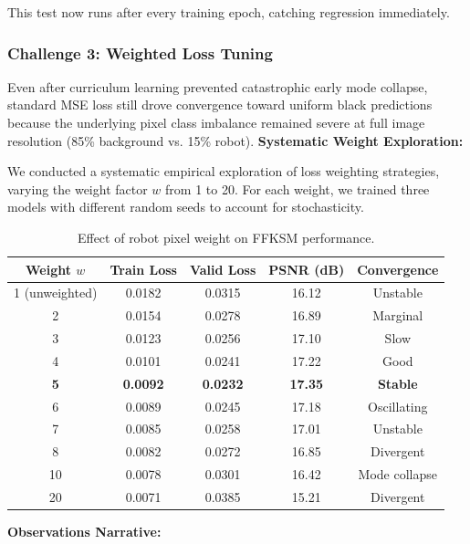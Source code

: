\documentclass[12pt,a4paper,oneside]{report}
\begin{document}
This test now runs after every training epoch, catching regression immediately.
\subsubsection{Challenge 3: Weighted Loss Tuning}
\label{subsubsec:challenge_3_weighted_loss_tuning}

Even after curriculum learning prevented catastrophic early mode collapse, standard MSE loss still drove convergence toward uniform black predictions because the underlying pixel class imbalance remained severe at full image resolution (85\% background vs. 15\% robot).
\textbf{Systematic Weight Exploration:}

We conducted a systematic empirical exploration of loss weighting strategies, varying the weight factor $w$ from 1 to 20. For each weight, we trained three models with different random seeds to account for stochasticity.
\begin{table}[H]
\centering

\caption{Effect of robot pixel weight on FFKSM performance.}
\label{tab:weight_tuning}
\begin{tabular}{ccccc}
\toprule

Weight $w$ & Train Loss & Valid Loss & PSNR (dB) & Convergence \\
\midrule

1 (unweighted) & 0.0182 & 0.0315 & 16.12 & Unstable \\

2 & 0.0154 & 0.0278 & 16.89 & Marginal \\

3 & 0.0123 & 0.0256 & 17.10 & Slow \\

4 & 0.0101 & 0.0241 & 17.22 & Good \\
\textbf{5} & \textbf{0.0092} & \textbf{0.0232} & \textbf{17.35} & \textbf{Stable} \\

6 & 0.0089 & 0.0245 & 17.18 & Oscillating \\

7 & 0.0085 & 0.0258 & 17.01 & Unstable \\

8 & 0.0082 & 0.0272 & 16.85 & Divergent \\

10 & 0.0078 & 0.0301 & 16.42 & Mode collapse \\

20 & 0.0071 & 0.0385 & 15.21 & Divergent \\
\bottomrule

\end{tabular}
\end{table}
\textbf{Observations Narrative:}
\end{document}
